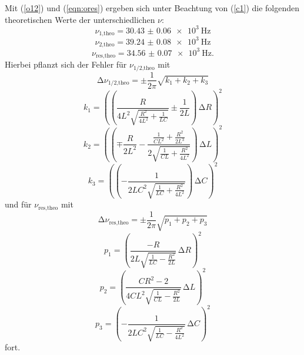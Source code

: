 Mit (\ref{o12}) und (\ref{eqn:ores}) ergeben sich unter Beachtung von (\ref{c1})
die folgenden theoretischen Werte der unterschiedlichen $\nu$:
\begin{equation*}
  \nu_{\text{1,theo}} = \SI{30.43(6)e3}{\hertz}
\end{equation*}
\begin{equation*}
  \nu_{\text{2,theo}} = \SI{39.24(8)e3}{\hertz}
\end{equation*}
\begin{equation*}
  \nu_{\text{res,theo}} = \SI{34.56(7)e3}{\hertz}.
\end{equation*}
Hierbei pflanzt sich der Fehler für $\nu_{\text{1/2,theo}}$ mit
\begin{equation*}
  \increment \nu_{\text{1/2,theo}} = \pm \frac{1}{2\pi} \sqrt{ k_1 + k_2 + k_3}
\end{equation*}
\begin{equation*}
 k_1 = \left(\left(\frac{R}{4L^2\sqrt{\frac{R^2}{4L^2} +\frac{1}{LC}}}\pm \frac{1}{2L}\right) \, \increment R \right)^2
\end{equation*}
\begin{equation*}
k_2 = \left(\left(
   \mp\frac{R}{2L^2}-\frac{\frac{1}{CL^2}+\frac{R^2}{2L^3}}{2\sqrt{\frac{1}{CL}+\frac{R^2}{4L^2}}}
\right) \, \increment L \right)^2
\end{equation*}
\begin{equation*}
k_3 =  \left(\left(
     -\frac{1}{2LC^2\sqrt{\frac{1}{LC}+\frac{R^2}{4L^2}}}
  \right) \, \increment C \right)^2
\end{equation*}
und für $\nu_{\text{res,theo}}$ mit
\begin{equation*}
\increment \nu_{\text{res,theo}} = \pm \frac{1}{2\pi}\sqrt{p_1 + p_2 + p_3}
\end{equation*}
\begin{equation*}
 p_1 = \left(\frac{-R}{2L\sqrt{\frac{1}{LC}-\frac{R^2}{2L}}} \, \increment R \right)^2
\end{equation*}
\begin{equation*}
p_2 = \left(
   \frac{CR^2-2}{4CL^2\sqrt{\frac{1}{CL}-\frac{R^2}{2L}}}
 \, \increment L \right)^2
\end{equation*}
\begin{equation*}
p_3 =  \left(
     -\frac{1}{2LC^2\sqrt{\frac{1}{LC}-\frac{R^2}{4L^2}}}
   \, \increment C \right)^2
\end{equation*}
fort.









